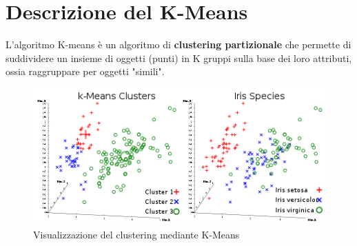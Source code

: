 \documentclass[a4paper, oneside]{book}
\begin{document}
\section*{Descrizione del K-Means}
L'algoritmo K-means è un algoritmo di \textbf{clustering partizionale} che permette di suddividere un insieme di oggetti (punti) in K gruppi sulla base dei loro attributi, ossia raggruppare per oggetti "simili". \\
\begin{figure}[htp]
\centering
\includegraphics[width=16cm]{kMeans.png}
\caption{Visualizzazione del clustering mediante K-Means}
\label{fig:kmeans}
\end{figure}
\\
\end{document}
